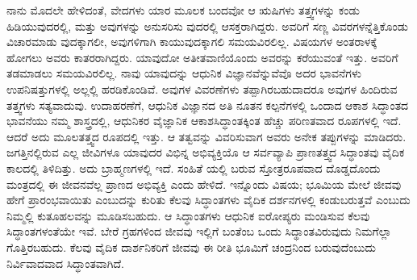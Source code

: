 ನಾನು ಮೊದಲೇ ಹೇಳಿದಂತೆ, ವೇದಗಳು ಯಾರ ಮೂಲಕ ಬಂದವೋ ಆ ಋಷಿಗಳು ತತ್ತ್ವಗಳನ್ನು ಕಂಡು ಹಿಡಿಯುವುದರಲ್ಲಿ, ಮತ್ತು ಅವುಗಳನ್ನು ಅನುಸರಿಸು ವುದರಲ್ಲಿ ಆಸಕ್ತರಾಗಿದ್ದರು. ಅವರಿಗೆ ಸಣ್ಣ ವಿವರಗಳನ್ನೆತ್ತಿಕೊಂಡು ವಿಚಾರಮಾಡು ವುದಕ್ಕಾಗಲೀ, ಅವುಗಳಿಗಾಗಿ ಕಾಯುವುದಕ್ಕಾಗಲಿ ಸಮಯವಿರಲಿಲ್ಲ. ವಿಷಯಗಳ ಅಂತರಾಳಕ್ಕೆ ಹೋಗಲು ಅವರು ಕಾತರರಾಗಿದ್ದರು. ಯಾವುದೋ ಅತೀತವಾಣಿಯೊಂದು ಅವರನ್ನು ಕರೆಯುವಂತೆ ಇತ್ತು. ಅವರಿಗೆ ತಡಮಾಡಲು ಸಮಯವಿರಲಿಲ್ಲ. ನಾವು ಯಾವುದನ್ನು ಆಧುನಿಕ ವಿಜ್ಞಾನವೆನ್ನುವೆವೊ ಅದರ ಭಾವನೆಗಳು ಉಪನಿಷತ್ತುಗಳಲ್ಲಿ ಅಲ್ಲಲ್ಲಿ ಹರಡಿಕೊಂಡಿವೆ. ಅವುಗಳ ವಿವರಣೆಗಳು ತಪ್ಪಾಗಿರಬಹುದಾದರೂ ಅವುಗಳ ಹಿಂದಿರುವ ತತ್ತ್ವಗಳು ಸತ್ಯವಾದುವು. ಉದಾಹರಣೆಗೆ, ಆಧುನಿಕ ವಿಜ್ಞಾನದ ಅತಿ ನೂತನ ಕಲ್ಪನೆಗಳಲ್ಲಿ ಒಂದಾದ ಆಕಾಶ ಸಿದ್ಧಾಂತದ ಭಾವನೆಯು ನಮ್ಮ ಶಾಸ್ತ್ರದಲ್ಲಿ, ಆಧುನಿಕರ ವೈಜ್ಞಾನಿಕ ಆಕಾಶಸಿದ್ಧಾಂತಕ್ಕಿಂತ ಹೆಚ್ಚು ಪರಿಣತವಾದ ರೂಪಗಳಲ್ಲಿ ಇದೆ. ಆದರೆ ಅದು ಮೂಲತತ್ತ್ವದ ರೂಪದಲ್ಲಿ ಇತ್ತು. ಆ ತತ್ವವನ್ನು ವಿವರಿಸುವಾಗ ಅವರು ಅನೇಕ ತಪ್ಪುಗಳನ್ನು ಮಾಡಿದರು. ಜಗತ್ತಿನಲ್ಲಿರುವ ಎಲ್ಲ ಜೀವಿಗಳೂ ಯಾವುದರ ವಿಭಿನ್ನ ಅಭಿವ್ಯಕ್ತಿಯೊ ಆ ಸರ್ವವ್ಯಾಪಿ ಪ್ರಾಣತತ್ತ್ವದ ಸಿದ್ಧಾಂತವು ವೈದಿಕ ಕಾಲದಲ್ಲಿ ತಿಳಿದಿತ್ತು. ಅದು ಬ್ರಾಹ್ಮಣಗಳಲ್ಲಿ ಇದೆ. ಸಂಹಿತೆ ಯಲ್ಲಿ ಬರುವ ಸ್ತೋತ್ರರೂಪವಾದ ದೊಡ್ಡದೊಂದು ಮಂತ್ರದಲ್ಲಿ ಈ ಜೀವನವೆಲ್ಲ ಪ್ರಾಣದ ಅಭಿವ್ಯಕ್ತಿ ಎಂದು ಹೇಳಿದೆ. ಇನ್ನೊಂದು ವಿಷಯ; ಭೂಮಿಯ ಮೇಲೆ ಜೀವವು ಹೇಗೆ ಪ್ರಾರಂಭವಾಯಿತು ಎಂಬುದನ್ನು ಕುರಿತು ಕೆಲವು ಸಿದ್ಧಾಂತಗಳು ವೈದಿಕ ದರ್ಶನಗಳಲ್ಲಿ ಕಂಡುಬರುತ್ತವೆ ಎಂಬುದು ನಿಮ್ಮಲ್ಲಿ ಕುತೂಹಲವನ್ನು ಮೂಡಿಸಬಹುದು. ಆ ಸಿದ್ಧಾಂತಗಳು ಆಧುನಿಕ ಐರೋಪ್ಯರು ಮಂಡಿಸುವ ಕೆಲವು ಸಿದ್ಧಾಂತಗಳಂತೆಯೇ ಇವೆ. ಬೇರೆ ಗ್ರಹಗಳಿಂದ ಜೀವವು ಇಲ್ಲಿಗೆ ಬಂತೆಂಬ ಒಂದು ಸಿದ್ಥಾಂತವಿರುವುದು ನಿಮಗೆಲ್ಲಾ ಗೊತ್ತಿರಬಹುದು. ಕೆಲವು ವೈದಿಕ ದಾರ್ಶನಿಕರಿಗೆ ಜೀವವು ಈ ರೀತಿ ಭೂಮಿಗೆ ಚಂದ್ರನಿಂದ ಬರುವುದೆಂಬುದು ನಿರ್ವಿವಾದವಾದ ಸಿದ್ಧಾಂತವಾಗಿದೆ.

